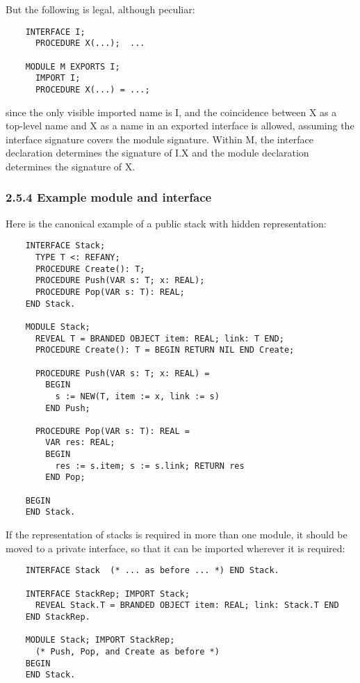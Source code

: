 \documentclass[10pt]{article}
\begin{document}
But the following is legal, although peculiar:
\begin{verbatim}
    INTERFACE I;
      PROCEDURE X(...);  ...

    MODULE M EXPORTS I;
      IMPORT I;
      PROCEDURE X(...) = ...;
\end{verbatim}
since the only visible imported name is I, and the coincidence between X as a
top-level name and X as a name in an exported interface is allowed, assuming
the interface signature covers the module signature.  Within M, the interface
declaration determines the signature of I.X and the module declaration
determines the signature of X.

\subsubsection*{2.5.4 Example module and interface}

Here is the canonical example of a public stack with hidden representation:
\begin{verbatim}
    INTERFACE Stack;
      TYPE T <: REFANY;
      PROCEDURE Create(): T;
      PROCEDURE Push(VAR s: T; x: REAL);
      PROCEDURE Pop(VAR s: T): REAL;
    END Stack.

    MODULE Stack;
      REVEAL T = BRANDED OBJECT item: REAL; link: T END;
      PROCEDURE Create(): T = BEGIN RETURN NIL END Create;

      PROCEDURE Push(VAR s: T; x: REAL) =
        BEGIN
          s := NEW(T, item := x, link := s)
        END Push;

      PROCEDURE Pop(VAR s: T): REAL =
        VAR res: REAL;
        BEGIN
          res := s.item; s := s.link; RETURN res
        END Pop;

    BEGIN
    END Stack.
\end{verbatim}

If the representation of stacks is required in more than one module, it should
be moved to a private interface, so that it can be imported wherever it is
required:
\begin{verbatim}
    INTERFACE Stack  (* ... as before ... *) END Stack.

    INTERFACE StackRep; IMPORT Stack;
      REVEAL Stack.T = BRANDED OBJECT item: REAL; link: Stack.T END
    END StackRep.

    MODULE Stack; IMPORT StackRep;
      (* Push, Pop, and Create as before *)
    BEGIN
    END Stack.
\end{verbatim}
\end{document}
